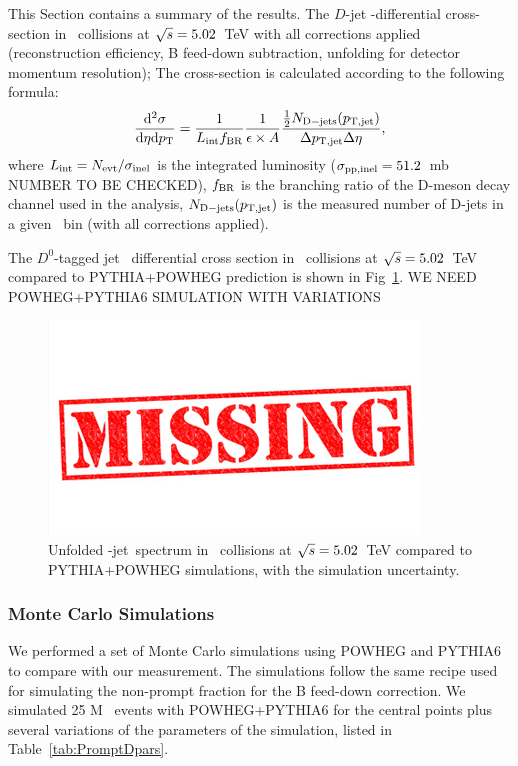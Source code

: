 This Section contains a summary of the results.
The  $D$-jet \pt-differential cross-section in \pp\ collisions at $\sqrt{s}=5.02$~TeV  with all corrections applied (reconstruction efficiency, B feed-down subtraction, unfolding for detector momentum resolution);
The cross-section is calculated according to the following formula:
\begin{equation}
\frac{{\rm d}^2\sigma}{{\rm d}\eta {\rm d}p_{\rm T}}=\frac{1}{L_{\rm int}f_{\rm BR}} \frac{1}{\epsilon \times A}  \frac{ \frac{1}{2} N_{\rm D-jets}(p_{\mathrm{T,jet}})}{ \Delta p_{\mathrm{T,jet}}\Delta\eta},
\end{equation}
where $L_{\rm int}=N_{\rm evt}/\sigma_{\rm inel}$ is the integrated luminosity ($\sigma_{\rm pp, inel} = 51.2$~mb {\color{red}NUMBER TO BE CHECKED}), $f_{\rm BR}$ is the branching
ratio of the D-meson decay channel used in the analysis, $N_{\rm D-jets}(p_{\mathrm{T,jet}})$ is the measured number of D-jets in a given \ptjet\ bin (with all corrections applied).



The $D^{0}$-tagged jet \pt\ differential cross section in \pp\ collisions at $\sqrt{s}=5.02$~TeV compared to PYTHIA+POWHEG prediction is shown in Fig~\ref{fig:pPbJetPt_final_D0}. {\color{red} WE NEED POWHEG+PYTHIA6 SIMULATION WITH VARIATIONS}
\begin{figure}[bth]
\centering
\includegraphics[width=.3\textwidth]{missing}
\caption{Unfolded \Dzero-jet\ spectrum in \pp\ collisions at $\sqrt{s}=5.02$~TeV compared to PYTHIA+POWHEG simulations, with the simulation uncertainty.}
\label{fig:pPbJetPt_final_D0}
\end{figure}



\subsubsection{Monte Carlo Simulations}
We performed a set of Monte Carlo simulations using POWHEG and PYTHIA6 to compare with our measurement.
The simulations follow the same recipe used for simulating the non-prompt fraction for the B feed-down correction.
We simulated 25 M \ccbar\ events with POWHEG+PYTHIA6 for the central points plus several variations of the parameters of the simulation, listed in Table~\ref{tab:PromptDpars}.


